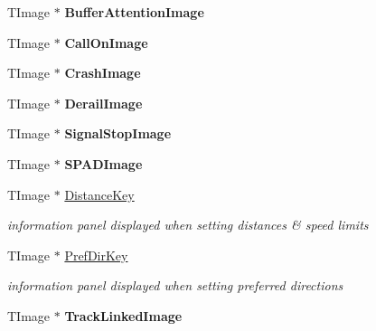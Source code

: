 \begin{DoxyCompactItemize}
T\+Image $\ast$ {\bfseries Buffer\+Attention\+Image}
\item 
\mbox{\label{class_t_interface_abf60e54b8e6b6faef216dde3c2a68b5d}} 
T\+Image $\ast$ {\bfseries Call\+On\+Image}
\item 
\mbox{\label{class_t_interface_abcd9d2a23c9167b3bba5e4b2f2b5d002}} 
T\+Image $\ast$ {\bfseries Crash\+Image}
\item 
\mbox{\label{class_t_interface_a1290b2c6729c464fb54ee97fe8a57b43}} 
T\+Image $\ast$ {\bfseries Derail\+Image}
\item 
\mbox{\label{class_t_interface_a75d82cea25dd30c67ee964e99be3b639}} 
T\+Image $\ast$ {\bfseries Signal\+Stop\+Image}
\item 
\mbox{\label{class_t_interface_a187eafb0bd574ab4b106ea526e05f139}} 
T\+Image $\ast$ {\bfseries S\+P\+A\+D\+Image}
\item 
\mbox{\label{class_t_interface_aefe8c85a36e64f78a69e5cde5ba13727}} 
T\+Image $\ast$ \mbox{\hyperlink{class_t_interface_aefe8c85a36e64f78a69e5cde5ba13727}{Distance\+Key}}
\begin{DoxyCompactList}\small\item\em information panel displayed when setting distances \& speed limits \end{DoxyCompactList}\item 
\mbox{\label{class_t_interface_a0183d2bace5c2b3f7a9e3a516c3d8f4b}} 
T\+Image $\ast$ \mbox{\hyperlink{class_t_interface_a0183d2bace5c2b3f7a9e3a516c3d8f4b}{Pref\+Dir\+Key}}
\begin{DoxyCompactList}\small\item\em information panel displayed when setting preferred directions \end{DoxyCompactList}\item 
\mbox{\label{class_t_interface_acda1eb5d85f40910fcda4b4580be1f7b}} 
T\+Image $\ast$ {\bfseries Track\+Linked\+Image}
\item 
\mbox{\label{class_t_interface_a9ca92690298b34e92e2dc6ddd7626e1d}} 

\end{DoxyCompactItemize}
